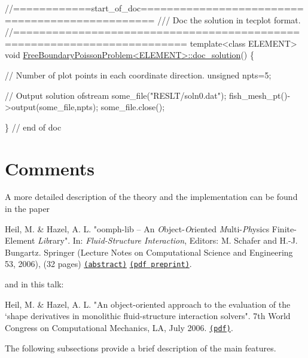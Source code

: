 \begin{DoxyCodeInclude}
\textcolor{comment}{//============start\_of\_doc================================================}
\textcolor{comment}{/// Doc the solution in tecplot format.}
\textcolor{comment}{}\textcolor{comment}{//========================================================================}
\textcolor{keyword}{template}<\textcolor{keyword}{class} ELEMENT>
\textcolor{keywordtype}{void} \hyperlink{classFreeBoundaryPoissonProblem_a2282d8ac1d5753771a9a3cfc0417f6b6}{FreeBoundaryPoissonProblem<ELEMENT>::doc\_solution}()
\{ 

 \textcolor{comment}{// Number of plot points in each coordinate direction.}
 \textcolor{keywordtype}{unsigned} npts=5;

 \textcolor{comment}{// Output solution }
 ofstream some\_file(\textcolor{stringliteral}{"RESLT/soln0.dat"});
 fish\_mesh\_pt()->output(some\_file,npts);
 some\_file.close();

\} \textcolor{comment}{// end of doc}

\end{DoxyCodeInclude}




 

\hypertarget{index_comments}{}\section{Comments}\label{index_comments}
A more detailed description of the theory and the implementation can be found in the paper
\begin{DoxyItemize}
\item Heil, M. \& Hazel, A. L. "{\ttfamily oomph-\/lib} -- An {\itshape O}bject-\/{\itshape O}riented {\itshape M}ulti-\/{\itshape Ph}ysics Finite-\/\+Element {\itshape Lib}rary". In\+: {\itshape Fluid-\/\+Structure Interaction}, Editors\+: M. Schafer and H.-\/J. Bungartz. Springer (Lecture Notes on Computational Science and Engineering 53, 2006), (32 pages) \href{http://www.maths.man.ac.uk/~mheil/MATTHIAS/ABSTRACTS/HeilHazelOomph2006.html}{\tt (abstract)} \href{http://www.maths.man.ac.uk/~mheil/MATTHIAS/PDF/oomph_for_www.pdf}{\tt (pdf preprint)}.
\end{DoxyItemize}and in this talk\+:
\begin{DoxyItemize}
\item Heil, M. \& Hazel, A. L. "An object-\/oriented approach to the evaluation of the `shape derivatives\textquotesingle{} in monolithic fluid-\/structure interaction solvers". 7th World Congress on Computational Mechanics, LA, July 2006. \href{http://www.maths.man.ac.uk/~mheil/oomph_lib_additional_material/LA_talk_2006/LA_talk.pdf}{\tt (pdf)}.
\end{DoxyItemize}The following subsections provide a brief description of the main features.



